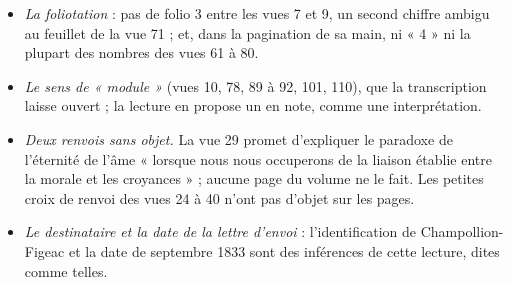 \documentclass[11pt,a4paper]{article}
\begin{document}
\begin{itemize}
    et leurs variantes, « Varlé », « Cherenoz », « Chévenon », « Georges », et le
    « M. D… » de la vue 33 — sont presque tous lus avec doute ; que ce soient des
    compositeurs est une inférence de la transcription.
  \item \emph{La foliotation} : pas de folio 3 entre les vues 7 et 9, un second
    chiffre ambigu au feuillet de la vue 71 ; et, dans la pagination de sa main,
    ni « 4 » ni la plupart des nombres des vues 61 à 80.
  \item \emph{Le sens de « module »} (vues 10, 78, 89 à 92, 101, 110), que la
    transcription laisse ouvert ; la lecture en propose un en note, comme une
    interprétation.
  \item \emph{Deux renvois sans objet.} La vue 29 promet d'expliquer le paradoxe
    de l'éternité de l'âme « lorsque nous nous occuperons de la liaison établie
    entre la morale et les croyances » ; aucune page du volume ne le fait. Les
    petites croix de renvoi des vues 24 à 40 n'ont pas d'objet sur les pages.
  \item \emph{Le destinataire et la date de la lettre d'envoi} : l'identification
    de Champollion-Figeac et la date de septembre 1833 sont des inférences de cette
    lecture, dites comme telles.
\end{itemize}
\end{document}
